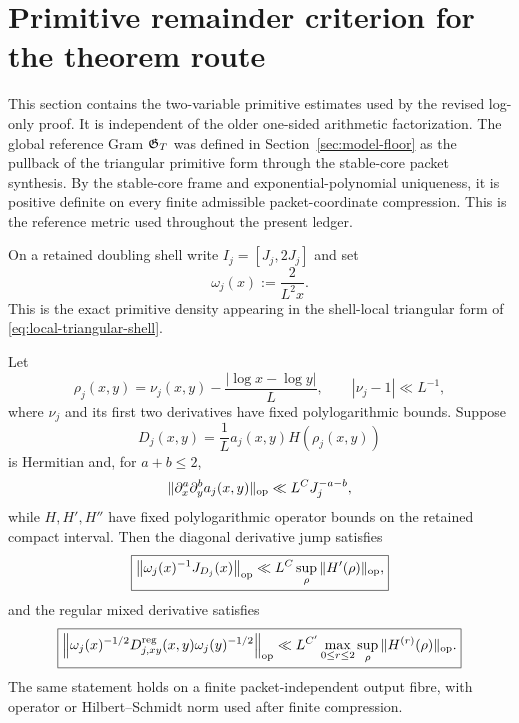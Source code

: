 \section{Primitive remainder criterion for the theorem route}
\label{sec:primitive-remainder-core}
\label{sec:ledger}

This section contains the two-variable primitive estimates used by the revised
log-only proof.  It is independent of the older one-sided arithmetic
factorization.  The global reference Gram $\mathfrak G_T$ was defined in
Section~\ref{sec:model-floor} as the pullback of the triangular primitive form
through the stable-core packet synthesis.  By the stable-core frame and
exponential-polynomial uniqueness, it is positive definite on every finite
admissible packet-coordinate compression.  This is the reference metric used
throughout the present ledger.

On a retained doubling shell write $I_j=[J_j,2J_j]$
and set
\begin{equation}
\boxed{\omega_j(x):=\frac{2}{L^2x}.}
\label{eq:logonly-local-primitive-weight}
\end{equation}
This is the exact primitive density appearing in the shell-local triangular
form of \eqref{eq:local-triangular-shell}.

\begin{lemma}
\label{lem:logonly-shell-normalization-transfer}
Let
\[
\rho_j(x,y)
=\nu_j(x,y)-\frac{|\log x-\log y|}{L},
\qquad |\nu_j-1|\ll L^{-1},
\]
where $\nu_j$ and its first two derivatives have fixed polylogarithmic bounds.
Suppose
\begin{equation}
D_j(x,y)=\frac1L a_j(x,y)H(\rho_j(x,y))
\label{eq:logonly-normalized-shell-kernel}
\end{equation}
is Hermitian and, for $a+b\le2$,
\[
\|\partial_x^a\partial_y^b a_j(x,y)\|_{\operatorname{op}}
\ll L^C J_j^{-a-b},
\]
while $H,H',H''$ have fixed polylogarithmic operator bounds on the retained
compact interval.  Then the diagonal derivative jump satisfies
\begin{equation}
\boxed{
\left\|\omega_j(x)^{-1}J_{D_j}(x)\right\|_{\operatorname{op}}
\ll L^C\sup_\rho\|H'(\rho)\|_{\operatorname{op}},
}
\label{eq:logonly-shell-jump-bound}
\end{equation}
and the regular mixed derivative satisfies
\begin{equation}
\boxed{
\left\|
\omega_j(x)^{-1/2}D_{j,xy}^{\rm reg}(x,y)
\omega_j(y)^{-1/2}
\right\|_{\operatorname{op}}
\ll L^{C'}
\max_{0\le r\le2}\sup_\rho\|H^{(r)}(\rho)\|_{\operatorname{op}}.
}
\label{eq:logonly-shell-mixed-bound}
\end{equation}
The same statement holds on a finite packet-independent output fibre, with
operator or Hilbert--Schmidt norm used after finite compression.
\end{lemma}

